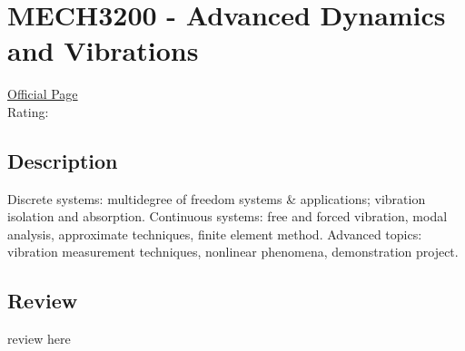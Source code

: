 \hypertarget{MECH3200}{\section{MECH3200 - Advanced Dynamics and Vibrations}}

\large
\textcolor{turbo_purple}{\href{https://my.uq.edu.au/programs-courses/course.html?course_code=MECH3200}{Official Page}} \\
Rating: \cstar\cstar\cstar\cstar\ostar

\normalsize
\subsection*{Description}
Discrete systems: multidegree of freedom systems \& applications; vibration isolation and absorption.
Continuous systems: free and forced vibration, modal analysis, approximate techniques, finite element method.
Advanced topics: vibration measurement techniques, nonlinear phenomena, demonstration project.

\subsection*{Review}
review here
